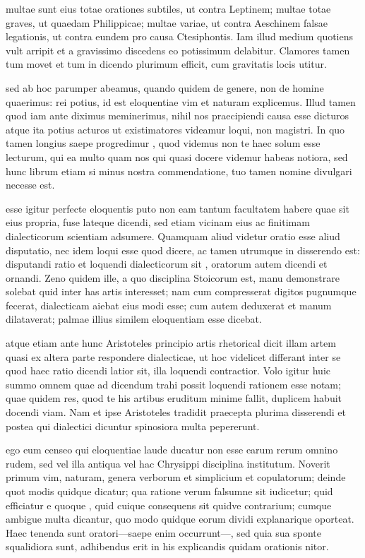  multae sunt eius totae orationes subtiles, ut contra Leptinem; multae totae graves, ut quaedam Philippicae; multae variae, ut contra Aeschinem falsae legationis, ut contra eundem pro causa Ctesiphontis. Iam illud medium quotiens vult arripit et a gravissimo discedens eo potissimum delabitur. Clamores tamen tum movet et tum in dicendo plurimum efficit, cum gravitatis locis utitur.

 sed ab hoc parumper abeamus, quando quidem de genere, non de homine quaerimus: rei potius, id est eloquentiae vim et naturam explicemus. Illud tamen quod iam ante diximus meminerimus, nihil nos praecipiendi causa esse dicturos atque ita potius acturos ut existimatores videamur loqui, non magistri. In quo tamen longius saepe progredimur , quod videmus non te haec solum esse lecturum, qui ea multo quam nos qui quasi docere videmur habeas notiora, sed hunc librum etiam si minus nostra commendatione, tuo tamen nomine divulgari necesse est.

 esse igitur perfecte eloquentis puto non eam tantum facultatem habere quae sit eius propria, fuse lateque dicendi, sed etiam vicinam eius ac finitimam dialecticorum scientiam adsumere. Quamquam aliud videtur oratio esse aliud disputatio, nec idem loqui esse quod dicere, ac tamen utrumque in disserendo est: disputandi ratio et loquendi dialecticorum sit , oratorum autem dicendi et ornandi. Zeno quidem ille, a quo disciplina Stoicorum est, manu demonstrare solebat quid inter has artis interesset; nam cum compresserat digitos pugnumque fecerat, dialecticam aiebat eius modi esse; cum autem deduxerat et manum dilataverat; palmae illius similem eloquentiam esse dicebat.

 atque etiam ante hunc Aristoteles principio artis rhetorical dicit illam artem quasi ex altera parte respondere dialecticae, ut hoc videlicet differant inter se quod haec ratio dicendi latior sit, illa loquendi contractior. Volo igitur huic summo omnem quae ad dicendum trahi possit loquendi rationem esse notam; quae quidem res, quod te his artibus eruditum minime fallit, duplicem habuit docendi viam. Nam et ipse Aristoteles tradidit praecepta plurima disserendi et postea qui dialectici dicuntur spinosiora multa pepererunt.

 ego eum censeo qui eloquentiae laude ducatur non esse earum rerum omnino rudem, sed vel illa antiqua vel hac Chrysippi disciplina institutum. Noverit primum vim, naturam, genera verborum et simplicium et copulatorum; deinde quot modis quidque dicatur; qua ratione verum falsumne sit iudicetur; quid efficiatur e quoque , quid cuique consequens sit quidve contrarium; cumque ambigue multa dicantur, quo modo quidque eorum dividi explanarique oporteat. Haec tenenda sunt oratori—saepe enim occurrunt—, sed quia sua sponte squalidiora sunt, adhibendus erit in his explicandis quidam orationis nitor.

